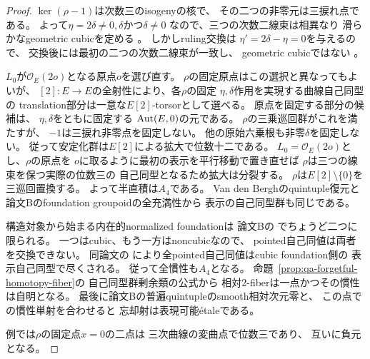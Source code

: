 \begin{proof}
$\ker(\rho-1)$は次数三のisogenyの核で、
その二つの非零元は三捩れ点である。
よって$\eta=2\delta\ne0,\delta$かつ$\delta\ne0$
なので、三つの次数二線束は相異なり
滑らかなgeometric cubicを定める
\cite[Definition 5.3.1, Theorem 5.5.10]{VdB2011}。
しかしruling交換は
$\eta'=2\delta-\eta=0$を与えるので、
交換後には最初の二つの次数二線束が一致し、
geometric cubicではない
\cite[\texttt{lem:elliptic-two-reflections}]{QuadricModuli2026}。

$L_0$が$\mathcal O_E(2o)$となる原点$o$を選び直す。
$\rho$の固定原点はこの選択と異なってもよいが、
$[2]:E\to E$の全射性により、各$\rho$の固定
$\eta,\delta$作用を実現する曲線自己同型の
translation部分は一意な$E[2]$-torsorとして選べる。
原点を固定する部分の候補は、
$\eta,\delta$をともに固定する
$\operatorname{Aut}(E,0)$の元である。
$\rho$の三乗巡回群がこれを満たすが、
$-1$は三捩れ非零点を固定しない。
他の原始六乗根も非零$\delta$を固定しない。
従って安定化群は$E[2]$による拡大で位数十二である。
$L_0=\mathcal O_E(2o)$とし、$\rho$の原点を
$o$に取るように最初の表示を平行移動で置き直せば
$\rho$は三つの線束を保つ実際の位数三の
自己同型となるため拡大は分裂する。
$\rho$は$E[2]\setminus\{0\}$を三巡回置換する。
よって半直積は$A_4$である。
Van den Berghのquintuple復元と
論文Bのfoundation groupoidの全充満性から
表示の自己同型群も同じである。

構造対象から始まる内在的normalized foundationは
論文Bの
\cite[\texttt{cor:two-intrinsic-foundations}]{QuadricModuli2026}
でちょうど二つに限られる。
一つはcubic、もう一方はnoncubicなので、
pointed自己同値は両者を交換できない。
同論文の
\cite[\texttt{cor:h2-point-groupoid-foundation}]{QuadricModuli2026}
により全pointed自己同値はcubic foundation側の
表示自己同型で尽くされる。
従って全慣性も$A_4$となる。
命題~\ref{prop:qa-forgetful-homotopy-fiber}の
自己同型群剰余類の公式から
相対2-fiberは一点かつその慣性は自明となる。
最後に論文Bの普遍quintupleのsmooth相対次元零と、
この点での慣性単射を合わせると
忘却射は表現可能étaleである。

例では$\rho$の固定点$x=0$の二点は
三次曲線の変曲点で位数三であり、
互いに負元となる。
\end{proof}

